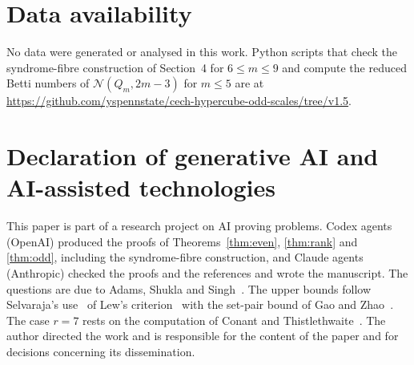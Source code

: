 \documentclass[11pt]{amsart}
\theoremstyle{definition}
\theoremstyle{remark}
\newcommand{\N}{\mathcal{N}}
\newcommand{\Q}{Q}
\begin{document}
\section*{Data availability}
No data were generated or analysed in this work. Python scripts that check the syndrome-fibre construction of
Section~4 for $6\le m\le9$ and compute the reduced Betti numbers of $\N(\Q_m,2m-3)$ for $m\le5$ are at
\url{https://github.com/yspennstate/cech-hypercube-odd-scales/tree/v1.5}.

\section*{Declaration of generative AI and AI-assisted technologies}
This paper is part of a research project on AI proving problems. Codex agents (OpenAI) produced the proofs of
Theorems~\ref{thm:even}, \ref{thm:rank} and \ref{thm:odd}, including the syndrome-fibre construction, and Claude agents
(Anthropic) checked the proofs and the references and wrote the manuscript. The
questions are due to Adams, Shukla and Singh~\cite{ASS}. The upper bounds follow Selvaraja's use~\cite{Sel} of Lew's
criterion~\cite{Lew} with the set-pair bound of Gao and Zhao~\cite{GZ}. The case $r=7$ rests on the computation of
Conant and Thistlethwaite~\cite{CT}. The author directed the work and is responsible
for the content of the paper and for decisions concerning its dissemination.
\end{document}
